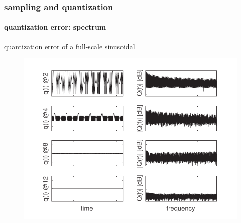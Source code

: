 	\begin{frame}\frametitle{sampling and quantization}\framesubtitle{quantization error: spectrum}
		\vspace{-4mm}
        quantization error of a full-scale sinusoidal
        \vspace{-3mm}
        \begin{figure}
			\centering
				\includegraphics[scale=.75]{Graph/quantcorr}
		\end{figure}
	\end{frame}		
